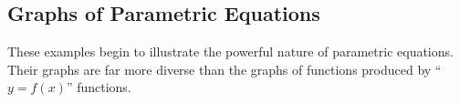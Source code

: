 
%


\subsection{Graphs of Parametric Equations}

These examples begin to illustrate the powerful nature of parametric equations. Their graphs are far more diverse than the graphs of functions produced by ``$y=f(x)$'' functions.

